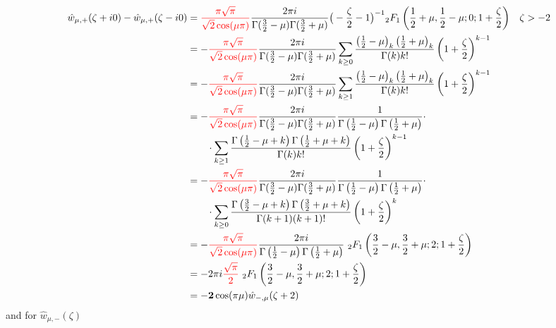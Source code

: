 \documentclass{article}
\begin{document}
\begin{align*}
\hat{w}_{\mu,+}(\zeta+i0)-\hat{w}_{\mu,+}(\zeta-i0)&=\textcolor{red}{\frac{\pi\sqrt{\pi}}{\sqrt{2}\cos(\mu \pi)}}\frac{2\pi i}{\Gamma(\tfrac{3}{2}-\mu)\Gamma(\tfrac{3}{2}+\mu)}\big(-\frac{\zeta}{2}-1\big)^{-1}{}_2F_1\left(\frac{1}{2}+\mu,\frac{1}{2}-\mu;0;1+\frac{\zeta}{2}\right) & \zeta>-2 \\
&=-\textcolor{red}{\frac{\pi\sqrt{\pi}}{\sqrt{2}\cos(\mu \pi)}}\frac{2\pi i}{\Gamma(\tfrac{3}{2}-\mu)\Gamma(\tfrac{3}{2}+\mu)}\sum_{k\geq 0}\frac{\left(\tfrac{1}{2}-\mu\right)_k\left(\tfrac{1}{2}+\mu\right)_k}{\Gamma(k)k!}\left(1+\frac{\zeta}{2}\right)^{k-1} & \\
&=-\textcolor{red}{\frac{\pi\sqrt{\pi}}{\sqrt{2}\cos(\mu \pi)}}\frac{2\pi i}{\Gamma(\tfrac{3}{2}-\mu)\Gamma(\tfrac{3}{2}+\mu)}\sum_{k\geq 1}\frac{\left(\tfrac{1}{2}-\mu\right)_k\left(\tfrac{1}{2}+\mu\right)_k}{\Gamma(k)k!}\left(1+\frac{\zeta}{2}\right)^{k-1} & \\
&=-\textcolor{red}{\frac{\pi\sqrt{\pi}}{\sqrt{2}\cos(\mu \pi)}}\frac{2\pi i}{\Gamma(\tfrac{3}{2}-\mu)\Gamma(\tfrac{3}{2}+\mu)}\frac{1}{\Gamma\left(\frac{1}{2}-\mu\right)\Gamma\left(\frac{1}{2}+\mu\right)}\cdot\\
& \qquad\cdot \sum_{k\geq 1}\frac{\Gamma\left(\tfrac{1}{2}-\mu+k\right)\Gamma\left(\tfrac{1}{2}+\mu+k\right)}{\Gamma(k)k!}\left(1+\frac{\zeta}{2}\right)^{k-1} & \\
&=-\textcolor{red}{\frac{\pi\sqrt{\pi}}{\sqrt{2}\cos(\mu \pi)}}\frac{2\pi i}{\Gamma(\tfrac{3}{2}-\mu)\Gamma(\tfrac{3}{2}+\mu)}\frac{1}{\Gamma\left(\frac{1}{2}-\mu\right)\Gamma\left(\frac{1}{2}+\mu\right)}\cdot \\
&\qquad\cdot \sum_{k\geq 0}\frac{\Gamma\left(\tfrac{3}{2}-\mu+k\right)\Gamma\left(\tfrac{3}{2}+\mu+k\right)}{\Gamma(k+1)(k+1)!}\left(1+\frac{\zeta}{2}\right)^{k} & \\
&=-\textcolor{red}{\frac{\pi\sqrt{\pi}}{\sqrt{2}\cos(\mu \pi)}}\frac{2\pi i}{\Gamma\left(\frac{1}{2}-\mu\right)\Gamma\left(\frac{1}{2}+\mu\right)}\,\, {}_2F_1\left(\frac{3}{2}-\mu,\frac{3}{2}+\mu;2;1+\frac{\zeta}{2}\right) & \\
&=-2\pi i\textcolor{red}{\frac{\sqrt{\pi}}{2}}\,\, {}_2F_1\left(\frac{3}{2}-\mu,\frac{3}{2}+\mu;2;1+\frac{\zeta}{2}\right)\\
&=\mathbf{-2}\cos(\pi\mu)\hat{w}_{-,\mu}(\zeta+2)
\end{align*} 
and for $\hat{w}_{\mu,-}(\zeta)$
\end{document}
